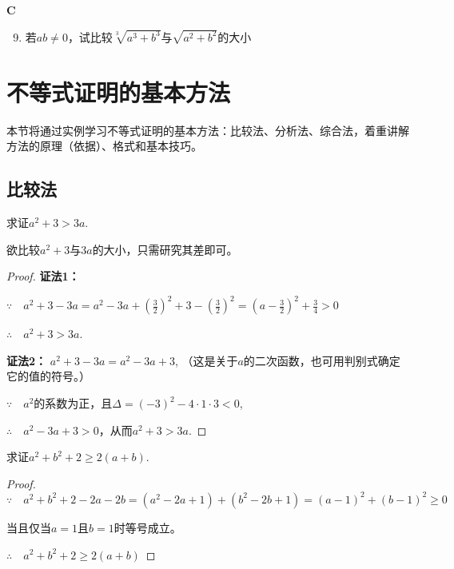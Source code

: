 \begin{center}
    \bfseries C
\end{center}

\begin{enumerate}
 \setcounter{enumi}{8}   \item 若$ab\ne 0$，试比较$\sqrt[3]{a^3+b^3}$与$\sqrt{a^2+b^2}$的大小
\end{enumerate}

\section{不等式证明的基本方法}
本节将通过实例学习不等式证明的基本方法：比较法、分析法、综合法，着重讲解方法的原理（依据）、格式和基本技巧。

\subsection{比较法}
\begin{example}
    求证$a^2+3>3a$.
\end{example}

\begin{analyze}
    欲比较$a^2+3$与$3a$的大小，只需研究其差即可。
\end{analyze}

\begin{proof}
\textbf{证法1：} 

$\because\quad a^2+3-3a=a^2-3a+\left(\frac{3}{2}\right)^2+3-\left(\frac{3}{2}\right)^2=\left(a-\frac{3}{2}\right)^2+\frac{3}{4}>0$

$\therefore\quad a^2+3>3a$.

\textbf{证法2：} $a^2+3-3a=a^2-3a+3$, 
（这是关于$a$的二次函数，也可用判别式确定它的值的符号。）

$\because\quad a^2$的系数为正，且$\Delta =(-3)^2-4\cdot 1\cdot 3<0$,

$\therefore\quad a^2-3a+3>0$，从而$a^2+3>3a$.    
\end{proof}

\begin{example}
    求证$a^2+b^2+2\ge 2(a+b)$.
\end{example}

\begin{proof}
    $\because\quad a^2+b^2+2-2a-2b=(a^2-2a+1)+(b^2-2b+1)=(a-1)^2+(b-1)^2\ge 0$

当且仅当$a=1$且$b=1$时等号成立。

$\therefore\quad a^2+b^2+2\ge 2(a+b)$
\end{proof}

